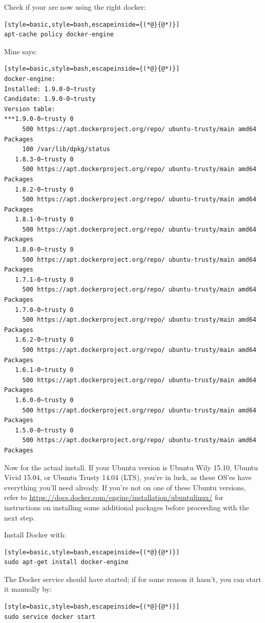\documentclass[12pt, a4paper, twoside, openany, titlepage]{book}
\begin{document}
Check if your are now using the right docker:
\begin{lstlisting}[style=basic,style=bash,escapeinside={(*@}{@*)}]
apt-cache policy docker-engine
\end{lstlisting}
Mine says:
\begin{lstlisting}[style=basic,style=bash,escapeinside={(*@}{@*)}]
docker-engine:
Installed: 1.9.0-0~trusty
Candidate: 1.9.0-0~trusty
Version table:
***1.9.0-0~trusty 0
     500 https://apt.dockerproject.org/repo/ ubuntu-trusty/main amd64 Packages
     100 /var/lib/dpkg/status
   1.8.3-0~trusty 0
     500 https://apt.dockerproject.org/repo/ ubuntu-trusty/main amd64 Packages
   1.8.2-0~trusty 0
     500 https://apt.dockerproject.org/repo/ ubuntu-trusty/main amd64 Packages
   1.8.1-0~trusty 0
     500 https://apt.dockerproject.org/repo/ ubuntu-trusty/main amd64 Packages
   1.8.0-0~trusty 0
     500 https://apt.dockerproject.org/repo/ ubuntu-trusty/main amd64 Packages
   1.7.1-0~trusty 0
     500 https://apt.dockerproject.org/repo/ ubuntu-trusty/main amd64 Packages
   1.7.0-0~trusty 0
     500 https://apt.dockerproject.org/repo/ ubuntu-trusty/main amd64 Packages
   1.6.2-0~trusty 0
     500 https://apt.dockerproject.org/repo/ ubuntu-trusty/main amd64 Packages
   1.6.1-0~trusty 0
     500 https://apt.dockerproject.org/repo/ ubuntu-trusty/main amd64 Packages
   1.6.0-0~trusty 0
     500 https://apt.dockerproject.org/repo/ ubuntu-trusty/main amd64 Packages
   1.5.0-0~trusty 0
     500 https://apt.dockerproject.org/repo/ ubuntu-trusty/main amd64 Packages
\end{lstlisting}

Now for the actual install. If your Ubuntu version is Ubuntu Wily 15.10, Ubuntu Vivid 15.04, or Ubuntu Trusty 14.04 (LTS), you're in luck, as these OS'es have everything you'll need already. If you're not on one of these Ubuntu versions, refer to \url{https://docs.docker.com/engine/installation/ubuntulinux/} for instructions on installing some additional packages before proceeding with the next step.

Install Docker with:
\begin{lstlisting}[style=basic,style=bash,escapeinside={(*@}{@*)}]
sudo apt-get install docker-engine
\end{lstlisting}

The Docker service should have started; if for some reason it hasn't, you can start it manually by:
\begin{lstlisting}[style=basic,style=bash,escapeinside={(*@}{@*)}]
sudo service docker start
\end{lstlisting}
\end{document}

